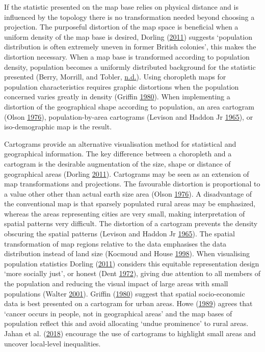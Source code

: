 \documentclass[11pt,]{article}
\begin{document}
If the statistic presented on the map base relies on physical distance
and is influenced by the topology there is no transformation needed
beyond choosing a projection. The purposeful distortion of the map space
is beneficial when a uniform density of the map base is desired, Dorling
(\protect\hyperlink{ref-ACTUC}{2011}) suggests `population distribution
is often extremely uneven in former British colonies', this makes the
distortion necessary. When a map base is transformed according to
population density, population becomes a uniformly distributed
background for the statistic presented (Berry, Morrill, and Tobler,
\protect\hyperlink{ref-GOINO}{n.d.}). Using choropleth maps for
population characteristics requires graphic distortions when the
population concerned varies greatly in density (Griffin
\protect\hyperlink{ref-CTTMB}{1980}). When implementing a distortion of
the geographical shape according to population, an area cartogram (Olson
\protect\hyperlink{ref-NAC}{1976}), population-by-area cartograms
(Levison and Haddon Jr \protect\hyperlink{ref-TAAM}{1965}), or
iso-demographic map is the result.

Cartograms provide an alternative visualisation method for statistical
and geographical information. The key difference between a choropleth
and a cartogram is the desirable augmentation of the size, shape or
distance of geographical areas (Dorling
\protect\hyperlink{ref-ACTUC}{2011}). Cartograms may be seen as an
extension of map transformations and projections. The favourable
distortion is proportional to a value other other than actual earth size
area (Olson \protect\hyperlink{ref-NAC}{1976}). A disadvantage of the
conventional map is that sparsely populated rural areas may be
emphasized, whereas the areas representing cities are very small, making
interpretation of spatial patterns very difficult. The distortion of a
cartogram prevents the density obscuring the spatial patterns (Levison
and Haddon Jr \protect\hyperlink{ref-TAAM}{1965}). The spatial
transformation of map regions relative to the data emphasises the data
distribution instead of land size (Kocmoud and House
\protect\hyperlink{ref-CBATCC}{1998}). When visualising population
statistics Dorling (\protect\hyperlink{ref-ACTUC}{2011}) considers this
equitable representation design `more socially just', or honest (Dent
\protect\hyperlink{ref-NISCC}{1972}), giving due attention to all
members of the population and reducing the visual impact of large areas
with small populations (Walter \protect\hyperlink{ref-DMAHP}{2001}).
Griffin (\protect\hyperlink{ref-CTTMB}{1980}) suggest that spatial
socio-economic data is best presented on a cartogram for urban areas.
Howe (\protect\hyperlink{ref-HEDP}{1989}) agrees that `cancer occurs in
people, not in geographical areas' and the map bases of population
reflect this and avoid allocating `undue prominence' to rural areas.
Jahan et al. (\protect\hyperlink{ref-MTMSIH}{2018}) encourage the use of
cartograms to highlight small areas and uncover local-level
inequalities.
\end{document}
